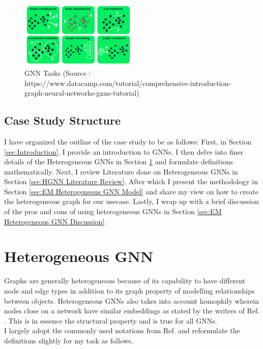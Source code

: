 \documentclass{report} %
\begin{document}
\begin{figure}[H]
    \centering
    \includegraphics[width=0.5\textwidth]{./ReportImages/GraphTasks.png} 
    \caption{\ac{GNN} Tasks (Source : https://www.datacamp.com/tutorial/comprehensive-introduction-graph-neural-networks-gnns-tutorial) }
    \label{fig:GNN Predictions}
\end{figure}

\subsection{Case Study Structure}\label{subsec:Case Study Structure}
I have organized the outline of the case study to be as follows:
First, in Section \ref{sec:Introduction}, I provide an introduction to \ac{GNN}s.
I then delve into finer details of the Heterogeneous \ac{GNN}s in Section \ref{sec:Heterogeneous GNN} and formulate definitions mathematically.
Next, I review Literature done on Heterogeneous \ac{GNN}s in Section \ref{sec:HGNN Literature Review}.
After which I present the methodology in Section \ref{sec:EM Heterogeneous GNN Model} and share my view on how to create the heterogeneous graph for our usecase.
Lastly, I wrap up with a brief discussion of the pros and cons of using heterogeneous \ac{GNN}s in Section \ref{sec:EM Heterogeneous GNN Discussion}.

\section{Heterogeneous GNN}\label{sec:Heterogeneous GNN}

Graphs are generally heterogeneous because of its capability to have different node and edge types in addition to its graph property of modelling relationships between objects.
Heterogeneous \ac{GNN}s also takes into account homophily wherein nodes close on a network have similar embeddings as stated by the writers of Ref. \cite{HGNN-2020}.
This is in essence the structural property and is true for all \ac{GNN}s. \\

I largely adopt the commonly used notations from Ref. \cite{ML HGNN-2023} and reformulate the definitions slightly for my task as follows. \\
\end{document}
